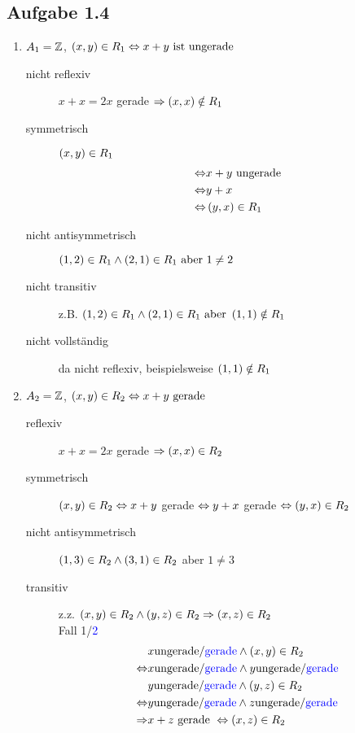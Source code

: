 \subsection{Aufgabe 1.4}
\begin{enumerate}[label=\alph*)]
\item $A_1 = \mathbb{Z}$, $\left(x, y\right) \in R_1 \Leftrightarrow x + y \text{ ist ungerade}$
	\begin{description}
	\item[nicht reflexiv] $x + x = 2x$ gerade $\Rightarrow \left(x, x\right) \notin R_1$
	\item[symmetrisch] $\left(x, y\right) \in R_1$
		\begin{align*}
		\Leftrightarrow& x + y \text{ ungerade}\\
		\Leftrightarrow& y + x\\
		\Leftrightarrow& \left(y, x\right) \in R_1
		\end{align*}

	\item[nicht antisymmetrisch] $\left(1, 2\right) \in R_1 \wedge \left(2, 1\right) \in R_1 \text{ aber } 1 \neq 2$
	\item[nicht transitiv] \ac{z.B.} $\left(1, 2\right) \in R_1 \wedge \left(2, 1\right) \in R_1 \text{ aber } \left(1, 1\right) \notin R_1$
	\item[nicht vollständig] da nicht reflexiv, beispielsweise $\left(1, 1\right) \notin R_1$
	\end{description}

\item $A_2 = \mathbb{Z}$, $\left(x, y\right) \in R_2 \Leftrightarrow x + y \text{ gerade}$
	\begin{description}
	\item[reflexiv] $x + x = 2x$ gerade $\Rightarrow \left(x, x\right) \in R_2$
	\item[symmetrisch] $\left(x, y\right) \in R_2 \Leftrightarrow x + y$ gerade $\Leftrightarrow y + x$ gerade $\Leftrightarrow \left(y, x\right) \in R_2$
	\item[nicht antisymmetrisch] $\left(1, 3\right) \in R_2 \wedge \left(3, 1\right) \in R_2$ aber $1 \neq 3$
	\item[transitiv] \ac{z.z.} $\left(x, y\right) \in R_2 \wedge \left(y, z\right) \in R_2 \Rightarrow \left(x, z\right) \in R_2$\\
		Fall 1/\textcolor{blue}{2}
		\begin{align*}
		&x \text{ungerade/\textcolor{blue}{gerade}} \wedge \left(x, y\right) \in R_2\\
		\Leftrightarrow & x \text{ungerade/\textcolor{blue}{gerade}} \wedge y \text{ungerade/\textcolor{blue}{gerade}}\\
		&y \text{ungerade/\textcolor{blue}{gerade}} \wedge \left(y, z\right) \in R_2\\
		\Leftrightarrow& y \text{ungerade/\textcolor{blue}{gerade}} \wedge z \text{ungerade/\textcolor{blue}{gerade}}\\
		\Rightarrow& x + z \text{ gerade } \Leftrightarrow \left(x, z\right) \in R_2
		\end{align*}


\end{description}
\end{enumerate}
